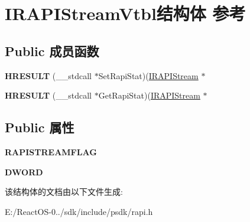\hypertarget{struct_i_r_a_p_i_stream_vtbl}{}\section{I\+R\+A\+P\+I\+Stream\+Vtbl结构体 参考}
\label{struct_i_r_a_p_i_stream_vtbl}
\subsection*{Public 成员函数}
\begin{DoxyCompactItemize}
\item 
\mbox{\label{struct_i_r_a_p_i_stream_vtbl_a0bd43d580646dbd2c791d88569c9f4ac}} 
{\bfseries H\+R\+E\+S\+U\+LT} (\+\_\+\+\_\+stdcall $\ast$Set\+Rapi\+Stat)(\hyperlink{struct_i_r_a_p_i_stream}{I\+R\+A\+P\+I\+Stream} $\ast$
\item 
\mbox{\label{struct_i_r_a_p_i_stream_vtbl_af6ddeb0787cf3a67db7ef9e054553bf8}} 
{\bfseries H\+R\+E\+S\+U\+LT} (\+\_\+\+\_\+stdcall $\ast$Get\+Rapi\+Stat)(\hyperlink{struct_i_r_a_p_i_stream}{I\+R\+A\+P\+I\+Stream} $\ast$
\end{DoxyCompactItemize}
\subsection*{Public 属性}
\begin{DoxyCompactItemize}
\item 
\mbox{\label{struct_i_r_a_p_i_stream_vtbl_ac02c05017ba19c26eae128157ee5abf7}} 
{\bfseries R\+A\+P\+I\+S\+T\+R\+E\+A\+M\+F\+L\+AG}
\item 
\mbox{\label{struct_i_r_a_p_i_stream_vtbl_acf89dd4775ec1cb8323315f20d0e950b}} 
{\bfseries D\+W\+O\+RD}
\end{DoxyCompactItemize}


该结构体的文档由以下文件生成\+:\begin{DoxyCompactItemize}
\item 
E\+:/\+React\+O\+S-\/0../sdk/include/psdk/rapi.\+h\end{DoxyCompactItemize}
